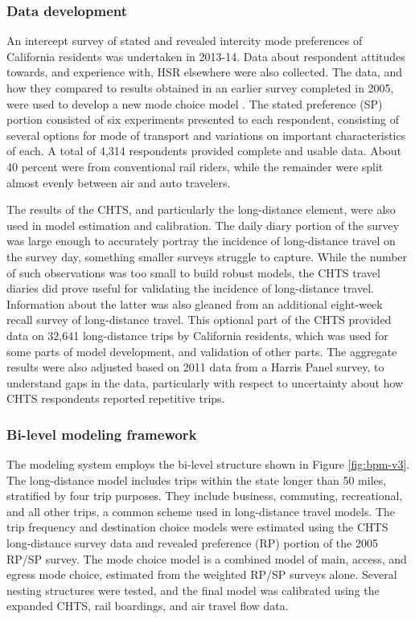 \subsubsection{Data development}

An intercept survey of stated and revealed intercity mode preferences of California residents was undertaken in 2013-14. Data about respondent attitudes towards, and experience with, HSR elsewhere were also collected. The data, and how they compared to results obtained in an earlier survey completed in 2005, were used to develop a new mode choice model \citep{cambridge15-hsrts}. The stated preference (SP) portion consisted of six experiments presented to each respondent, consisting of several options for mode of transport and variations on important characteristics of each. A total of 4,314 respondents provided complete and usable data. About 40 percent were from conventional rail riders, while the remainder were split almost evenly between air and auto travelers.

The results of the CHTS, and particularly the long-distance element, were also used in model estimation and calibration. The daily diary portion of the survey was large enough to accurately portray the incidence of long-distance travel on the survey day, something smaller surveys struggle to capture. While the number of such observations was too small to build robust models, the CHTS travel diaries did prove useful for validating the incidence of long-distance travel. Information about the latter was also gleaned from an additional eight-week recall survey of long-distance travel. This optional part of the CHTS provided data on 32,641 long-distance trips by California residents, which was used for some parts of model development, and validation of other parts. The aggregate results were also adjusted based on 2011 data from a Harris Panel survey, to understand gaps in the data, particularly with respect to uncertainty about how CHTS respondents reported repetitive trips.

\subsubsection{Bi-level modeling framework}

The modeling system employs the bi-level structure shown in Figure \ref{fig:bpm-v3}. The long-distance model includes trips within the state longer than 50 miles, stratified by four trip purposes. They include business, commuting, recreational, and all other trips, a common scheme used in long-distance travel models. The trip frequency and destination choice models were estimated using the CHTS long-distance survey data and revealed preference (RP) portion of the 2005 RP/SP survey. The mode choice model is a combined model of main, access, and egress mode choice, estimated from the weighted RP/SP surveys alone. Several nesting structures were tested, and the final model was calibrated using the expanded CHTS, rail boardings, and air travel flow data.

